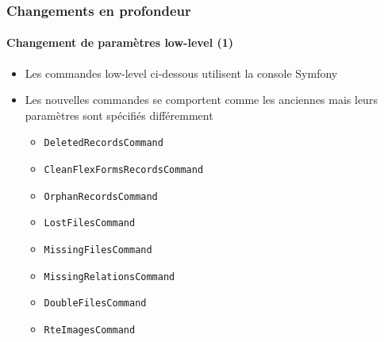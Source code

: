 \begin{frame}[fragile]
	\frametitle{Changements en profondeur}
	\framesubtitle{Changement de paramètres low-level (1)}


	\begin{itemize}
		\item Les commandes low-level ci-dessous utilisent la console Symfony
		\item Les nouvelles commandes se comportent comme les anciennes mais
			leurs paramètres sont spécifiés différemment

			\begin{itemize}
				\item \texttt{DeletedRecordsCommand}
				\item \texttt{CleanFlexFormsRecordsCommand}
				\item \texttt{OrphanRecordsCommand}
				\item \texttt{LostFilesCommand}
				\item \texttt{MissingFilesCommand}
				\item \texttt{MissingRelationsCommand}
				\item \texttt{DoubleFilesCommand}
				\item \texttt{RteImagesCommand}
			\end{itemize}

	\end{itemize}

\end{frame}




